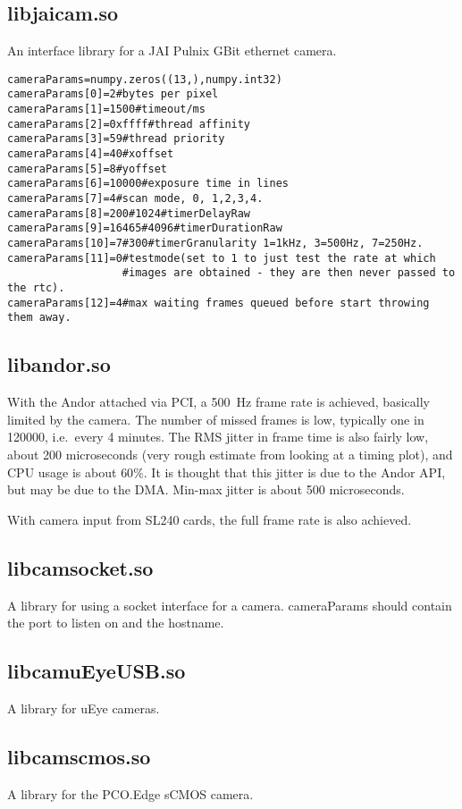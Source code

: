 \documentclass[a4,10pt]{article}
\begin{document}
\subsection{libjaicam.so}
An interface library for a JAI Pulnix GBit ethernet camera.
\begin{verbatim}
cameraParams=numpy.zeros((13,),numpy.int32)
cameraParams[0]=2#bytes per pixel
cameraParams[1]=1500#timeout/ms
cameraParams[2]=0xffff#thread affinity
cameraParams[3]=59#thread priority
cameraParams[4]=40#xoffset
cameraParams[5]=8#yoffset
cameraParams[6]=10000#exposure time in lines
cameraParams[7]=4#scan mode, 0, 1,2,3,4.
cameraParams[8]=200#1024#timerDelayRaw
cameraParams[9]=16465#4096#timerDurationRaw
cameraParams[10]=7#300#timerGranularity 1=1kHz, 3=500Hz, 7=250Hz.
cameraParams[11]=0#testmode(set to 1 to just test the rate at which
                  #images are obtained - they are then never passed to the rtc).
cameraParams[12]=4#max waiting frames queued before start throwing them away.
\end{verbatim}

\subsection{libandor.so}
With the Andor attached via PCI, a 500~Hz frame rate is achieved,
basically limited by the camera.  The number of missed frames is low,
typically one in 120000, i.e.\ every 4 minutes.  The RMS jitter in
frame time is also fairly low, about 200 microseconds (very rough
estimate from looking at a timing plot), and CPU usage is about
$60\%$.  It is thought that this jitter is due to the Andor API, but
may be due to the DMA.  Min-max jitter is about 500 microseconds.  

With camera input from SL240 cards, the full frame rate is also achieved.

\subsection{libcamsocket.so}
A library for using a socket interface for a camera.  cameraParams
should contain the port to listen on and the hostname.

\subsection{libcamuEyeUSB.so}
A library for uEye cameras.

\subsection{libcamscmos.so}
A library for the PCO.Edge sCMOS camera.
\end{document}
